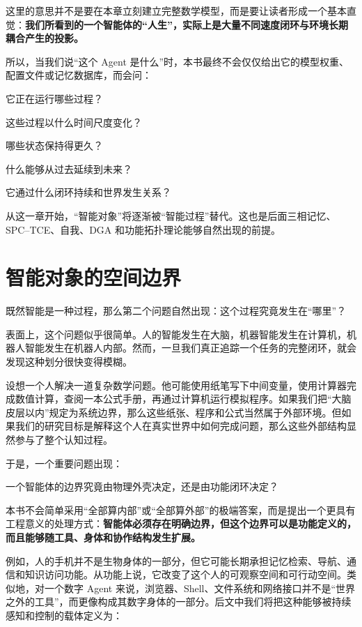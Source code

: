 这里的意思并不是要在本章立刻建立完整数学模型，而是要让读者形成一个基本直觉：\textbf{我们所看到的一个智能体的“人生”，实际上是大量不同速度闭环与环境长期耦合产生的投影。}

所以，当我们说“这个 Agent 是什么”时，本书最终不会仅仅给出它的模型权重、配置文件或记忆数据库，而会问：

它正在运行哪些过程？

这些过程以什么时间尺度变化？

哪些状态保持得更久？

什么能够从过去延续到未来？

它通过什么闭环持续和世界发生关系？

从这一章开始，“智能对象”将逐渐被“智能过程”替代。这也是后面三相记忆、SPC--TCE、自我、DGA 和功能拓扑理论能够自然出现的前提。

\section{智能对象的空间边界}

既然智能是一种过程，那么第二个问题自然出现：这个过程究竟发生在“哪里”？

表面上，这个问题似乎很简单。人的智能发生在大脑，机器智能发生在计算机，机器人智能发生在机器人内部。然而，一旦我们真正追踪一个任务的完整闭环，就会发现这种划分很快变得模糊。

设想一个人解决一道复杂数学问题。他可能使用纸笔写下中间变量，使用计算器完成数值计算，查阅一本公式手册，再通过计算机运行模拟程序。如果我们把“大脑皮层以内”规定为系统边界，那么这些纸张、程序和公式当然属于外部环境。但如果我们的研究目标是解释这个人在真实世界中如何完成问题，那么这些外部结构显然参与了整个认知过程。

于是，一个重要问题出现：
\begin{statementbox}
一个智能体的边界究竟由物理外壳决定，还是由功能闭环决定？
\end{statementbox}

本书不会简单采用“全部算内部”或“全部算外部”的极端答案，而是提出一个更具有工程意义的处理方式：\textbf{智能体必须存在明确边界，但这个边界可以是功能定义的，而且能够随工具、身体和协作结构发生扩展。}

例如，人的手机并不是生物身体的一部分，但它可能长期承担记忆检索、导航、通信和知识访问功能。从功能上说，它改变了这个人的可观察空间和可行动空间。类似地，对一个数字 Agent 来说，浏览器、Shell、文件系统和网络接口并不是“世界之外的工具”，而更像构成其数字身体的一部分。后文中我们将把这种能够被持续感知和控制的载体定义为：
\begin{statementbox}
\centering
{}
\end{statementbox}

